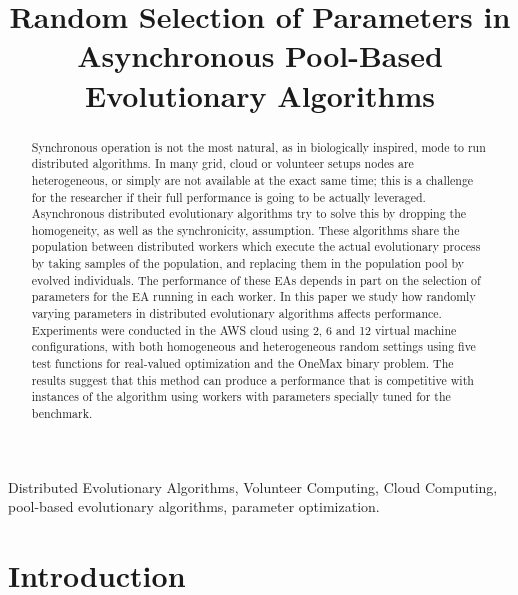 \documentclass[conference]{IEEEtran}
\begin{document}
\title{Random Selection of Parameters in Asynchronous Pool-Based Evolutionary Algorithms}

\author{
  \and
}

\maketitle
\begin{abstract}
  Synchronous operation is not the most natural, as in biologically
  inspired, mode to run
distributed algorithms. In many grid, cloud or volunteer setups nodes
are heterogeneous, or simply are not available at the exact same time;
this is a challenge for the researcher if their full performance is
going to be actually leveraged. Asynchronous distributed evolutionary
algorithms try to solve this by dropping the homogeneity, as well as
the synchronicity, assumption. These algorithms share the population between distributed
workers which execute the actual evolutionary process by taking
samples of the population, and replacing them in the population pool
by evolved individuals. The performance of these EAs depends in part
on the selection of parameters for the EA running in each worker. In
this paper we study how randomly varying parameters in distributed
evolutionary algorithms affects performance. Experiments were
conducted in the AWS cloud using 2, 6 and 12 virtual machine
configurations, with both homogeneous and heterogeneous random
settings using five test functions for real-valued optimization and
the OneMax binary problem. The results suggest that this method can
produce a performance that is competitive with instances of the
algorithm using workers with parameters specially tuned for the
benchmark.
\end{abstract}


\begin{IEEEkeywords}
  Distributed Evolutionary Algorithms, Volunteer Computing,
  Cloud Computing, pool-based evolutionary algorithms, parameter optimization.
\end{IEEEkeywords}

\section{Introduction}
\end{document}
